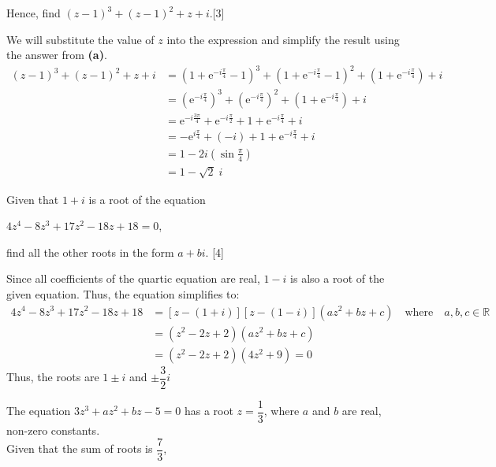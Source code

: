 \documentclass[12pt, a4 paper]{article}
\begin{document}
\begin{outline}[enumerate]
	\2 Hence, find $(z-1)^3+(z-1)^2+z+i$.\hfill[3]
	\begin{answer}
		We will substitute the value of $z$ into the expression and simplify the result using the answer from \textbf{(a)}.
		\begin{align*}
			(z-1)^3+(z-1)^2+z+i & = (1+\mathrm{e}^{-i\frac{\pi}{4}} - 1)^3 + (1+\mathrm{e}^{-i\frac{\pi}{4}} - 1)^2 + (1+\mathrm{e}^{-i\frac{\pi}{4}}) + i \\   
			                    & = (\mathrm{e}^{-i\frac{\pi}{4}})^3 + (\mathrm{e}^{-i\frac{\pi}{4}})^2 + (1+\mathrm{e}^{-i\frac{\pi}{4}}) + i             \\
			                    & = \mathrm{e}^{-i\frac{3\pi}{4}} + \mathrm{e}^{-i\frac{\pi}{2}} + 1+\mathrm{e}^{-i\frac{\pi}{4}} + i                      \\
			                    & = -\mathrm{e}^{i\frac{\pi}{4}} + (-i) + 1+\mathrm{e}^{-i\frac{\pi}{4}} + i                                               \\
			                    & = 1 - 2i(\sin{\frac{\pi}{4}})                                                                                            \\
			                    & = 1-\sqrt{2}\;i                                                                                                          
		\end{align*}
	\end{answer}        
	\1 Given that $1+i$ is a root of the equation\begin{center}$4z^4-8z^3+17z^2-18z+18=0$,\end{center}find all the other roots in the form $a+bi$. \hfill[4] %
	\begin{answer}
		Since all coefficients of the quartic equation are real, $1-i$ is also a root of the given equation. Thus, the equation simplifies to:
		\begin{align*}
			4z^4-8z^3+17z^2-18z+18 & =[z-(1+i)][z-(1-i)](az^2+bz+c) \quad\textrm{where}\quad a,b,c\in\mathbb{R} \\
			                       & = (z^2-2z+2)(az^2+bz+c)                                                    \\
			                       & = (z^2-2z+2)(4z^2+9) = 0                                                   
		\end{align*}
		Thus, the roots are $1\pm i$ and $\pm\dfrac{3}{2}i$
	\end{answer}
		
	\1 The equation $3z^3+az^2+bz-5=0$ has a root $z=\dfrac{1}{3}$, where $a$ and $b$ are real, non-zero constants.\\Given that the sum of roots is $\dfrac{7}{3}$, %
		    

\end{outline}
\end{document}

